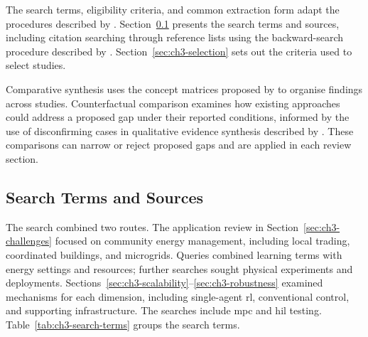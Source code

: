 The search terms, eligibility criteria, and common extraction form adapt the procedures described by \textcite{kitchenham2007guidelines}. Section~\ref{sec:ch3-search} presents the search terms and sources, including citation searching through reference lists using the backward-search procedure described by \textcite{wohlin2014snowballing}. Section~\ref{sec:ch3-selection} sets out the criteria used to select studies.

Comparative synthesis uses the concept matrices proposed by \textcite{webster2002review} to organise findings across studies. Counterfactual comparison examines how existing approaches could address a proposed gap under their reported conditions, informed by the use of disconfirming cases in qualitative evidence synthesis described by \textcite{booth2013dissonance}. These comparisons can narrow or reject proposed gaps and are applied in each review section.

\subsection{Search Terms and Sources}
\label{sec:ch3-search}
\label{sec:ch2-sources}

The search combined two routes. The application review in Section~\ref{sec:ch3-challenges} focused on community energy management, including local trading, coordinated buildings, and microgrids. Queries combined learning terms with energy settings and resources; further searches sought physical experiments and deployments. Sections~\ref{sec:ch3-scalability}--\ref{sec:ch3-robustness} examined mechanisms for each dimension, including single-agent \gls{rl}, conventional control, and supporting infrastructure. The searches include \gls{mpc} and \gls{hil} testing. Table~\ref{tab:ch3-search-terms} groups the search terms.


